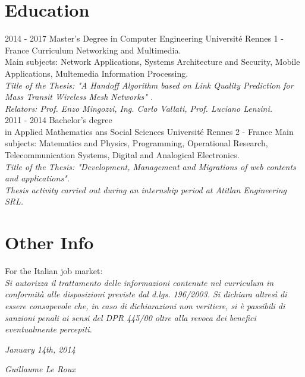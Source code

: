 \documentclass{friggeri-cv}
\begin{document}
\section{Education}
\begin{entrylist}
	\entry
	{2014 - 2017}
	{Master's Degree in Computer Engineering}
	{Université Rennes 1 - France}
	{Curriculum Networking and Multimedia.\\
	Main subjects: Network Applications, Systems Architecture and Security, Mobile Applications, Multemedia Information            Processing.\\
	\emph{Title of the Thesis: "A Handoff Algorithm based on Link Quality Prediction for Mass Transit Wireless Mesh Networks"      .}\\
	\emph{Relators: Prof. Enzo Mingozzi, Ing. Carlo Vallati, Prof. Luciano Lenzini.}\\}
	\entry
	{2011 - 2014}
	{ Bachelor's degree \\in Applied Mathematics ans Social Sciences }
	{Université Rennes 2 - France}
	{Main subjects: Matematics and Physics, Programming, Operational Research, Telecommunication Systems, Digital and Analogical Electronics.\\
	\emph{Title of the Thesis: "Development, Management and Migrations of web contents and applications".}\\
	\emph{Thesis activity carried out during an internship period at Atitlan Engineering SRL.}\\}
\end{entrylist}


\section{Other Info}
For the Italian job market:\\
\emph{Si autorizza il trattamento delle informazioni contenute nel curriculum in conformità alle disposizioni previste dal d.lgs. 196/2003. Si dichiara altresì di essere consapevole che, in caso di dichiarazioni non veritiere, si è passibili di sanzioni penali ai sensi del DPR 445/00 oltre alla revoca dei benefici eventualmente percepiti.}
\\
\begin{flushleft}
	\emph{January 14th, 2014}
\end{flushleft}
\begin{flushright}
	\emph{Guillaume Le Roux}
\end{flushright}
\end{document}
